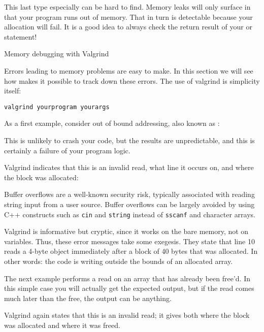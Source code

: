 This last type especially can be hard to find.
Memory leaks will only surface in that your program runs out of
  memory. That in turn is detectable because your allocation will
  fail. It is a good idea to always check the return result of your
   or  statement!

 {Memory debugging with Valgrind}
\label{sec:valgrind}

Errors leading to memory problems are easy to make.
In this section we will see how 
makes it possible to track down these errors.
The use of valgrind is simplicity itself:
\begin{lstlisting}
valgrind yourprogram yourargs
\end{lstlisting}

As a first example, consider out of bound addressing,
also known as :
%

This is unlikely to crash your code,
but the results are unpredictable,
and this is certainly a failure of your program logic.

Valgrind indicates that this is an invalid read,
what line it occurs on,
and where the block was allocated:
%


\begin{remark}
  Buffer overflows are a well-known security risk,
  typically associated with reading string input
  from a user source.
  Buffer overflows can be largely avoided by using
  C++ constructs such as \lstinline{cin} and \lstinline{string}
  instead of \lstinline{sscanf} and character arrays.
\end{remark}

Valgrind is informative but cryptic, since it works on the bare
memory, not on variables. Thus, these error messages take some
exegesis. They state that line 10 reads a 4-byte object immediately
after a block of 40 bytes that was allocated. In other words: the code
is writing outside the bounds of an allocated array.

The next example performs a read on an array that has already been free'd.
In this simple case you will actually get the expected output,
but if the read comes much later than the free, the output can be anything.
%

Valgrind again states that this is an invalid read;
it gives both where the block was allocated and where it was freed.
%


